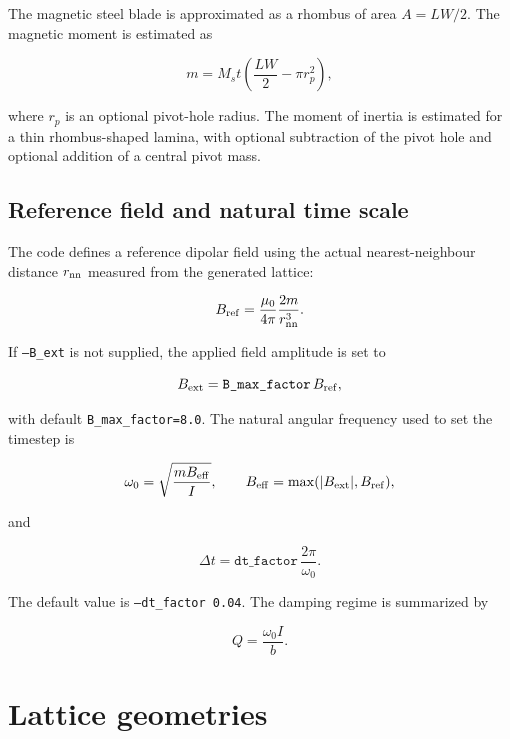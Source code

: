 \documentclass[11pt,a4paper]{article}
\newcommand{\code}[1]{\texttt{#1}}
\begin{document}
The magnetic steel blade is approximated as a rhombus of area $A=L W/2$. The magnetic moment is estimated as

\begin{equation}
m = M_s t\left(\frac{LW}{2} - \pi r_p^2\right),
\end{equation}

where $r_p$ is an optional pivot-hole radius. The moment of inertia is estimated for a thin rhombus-shaped lamina, with optional subtraction of the pivot hole and optional addition of a central pivot mass.

\subsection{Reference field and natural time scale}

The code defines a reference dipolar field using the actual nearest-neighbour distance $r_{\rm nn}$ measured from the generated lattice:

\begin{equation}
B_{\rm ref}=\frac{\mu_0}{4\pi}\frac{2m}{r_{\rm nn}^3}.
\end{equation}

If \code{--B\_ext} is not supplied, the applied field amplitude is set to

\begin{equation}
B_{\rm ext}=\code{B\_max\_factor}\,B_{\rm ref},
\end{equation}

with default \code{B\_max\_factor=8.0}. The natural angular frequency used to set the timestep is

\begin{equation}
\omega_0 = \sqrt{\frac{m B_{\rm eff}}{I}}, \qquad B_{\rm eff}=\max(|B_{\rm ext}|,B_{\rm ref}),
\end{equation}

and

\begin{equation}
\Delta t = \code{dt\_factor}\,\frac{2\pi}{\omega_0}.
\end{equation}

The default value is \code{--dt\_factor 0.04}. The damping regime is summarized by

\begin{equation}
Q=\frac{\omega_0 I}{b}.
\end{equation}

\section{Lattice geometries}
\label{sec:geometry}
\end{document}
